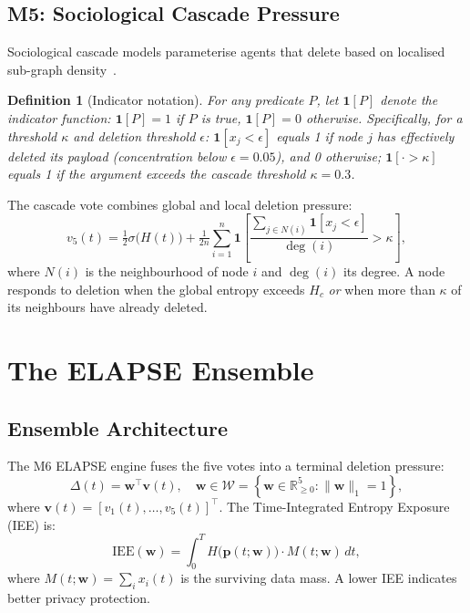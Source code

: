 \documentclass[review,12pt]{elsarticle}
\newcommand{\R}{\mathbb{R}}
\newcommand{\ind}{\mathbf{1}}       %
\newcommand{\bfw}{\mathbf{w}}
\newcommand{\bfv}{\mathbf{v}}
\newcommand{\IEE}{\mathrm{IEE}}
\newcommand{\Hc}{H_c}
\newtheorem{definition}{Definition}
\begin{document}
\subsection{M5: Sociological Cascade Pressure}

Sociological cascade models parameterise agents that delete based on
localised sub-graph density~\cite{watts2002simple,guilbeault2018complex}.

\begin{definition}[Indicator notation]
\label{def:indicator}
For any predicate $P$, let $\ind[P]$ denote the indicator function:
$\ind[P] = 1$ if $P$ is true, $\ind[P] = 0$ otherwise.
Specifically, for a threshold $\kappa$ and deletion threshold $\epsilon$:
$\ind[x_j < \epsilon]$ equals 1 if node $j$ has effectively deleted its
payload (concentration below $\epsilon = 0.05$), and 0 otherwise;
$\ind[\cdot > \kappa]$ equals 1 if the argument exceeds the cascade
threshold $\kappa = 0.3$.
\end{definition}

The cascade vote combines global and local deletion pressure:
\begin{equation}
  v_5(t) = \tfrac{1}{2}\sigma\!\bigl(H(t)\bigr)
           + \tfrac{1}{2n}\sum_{i=1}^{n}
  \ind\!\!\left[
    \frac{\sum_{j \in N(i)}\ind[x_j < \epsilon]}{\deg(i)}
    > \kappa
  \right],
  \label{eq:social}
\end{equation}
where $N(i)$ is the neighbourhood of node $i$ and $\deg(i)$ its degree.
A node responds to deletion when the global entropy exceeds $\Hc$
\emph{or} when more than $\kappa$ of its neighbours have already deleted.

\section{The ELAPSE Ensemble}
\label{sec:ensemble}

\subsection{Ensemble Architecture}

The M6 ELAPSE engine fuses the five votes into a terminal deletion pressure:
\begin{equation}
  \Delta(t) = \bfw^\top \bfv(t), \quad
  \bfw \in \mathcal{W} = \!\left\{\bfw \in \R^5_{\geq 0} : \|\bfw\|_1 = 1\right\},
  \label{eq:ensemble}
\end{equation}
where $\bfv(t) = [v_1(t),\ldots,v_5(t)]^\top$.
The Time-Integrated Entropy Exposure (IEE) is:
\begin{equation}
  \IEE(\bfw) = \int_0^T H\!\bigl(\mathbf{p}(t;\bfw)\bigr)\cdot M(t;\bfw)\,dt,
  \label{eq:iee}
\end{equation}
where $M(t;\bfw) = \sum_i x_i(t)$ is the surviving data mass. A lower
IEE indicates better privacy protection.
\end{document}
